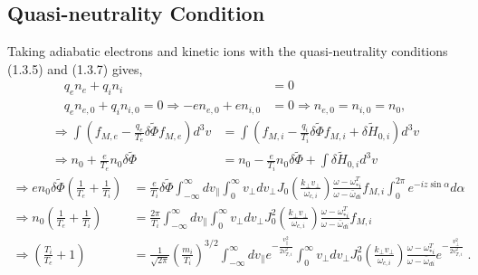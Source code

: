 \documentclass[12pt]{article}
\numberwithin{equation}{subsection}
\begin{document}
\subsection{Quasi-neutrality Condition}
   \quad Taking adiabatic electrons and kinetic ions with the quasi-neutrality conditions (1.3.5) and (1.3.7) gives,
   \begin{equation}
   \begin{aligned}
      q_en_e     + q_in_i     &= 0 \\
      q_en_{e,0} + q_in_{i,0}  = 0 \Rightarrow -en_{e,0} + en_{i,0} &= 0 \Rightarrow n_{e,0} = n_{i,0} = n_0,
   \end{aligned}
   \end{equation}
   \begin{equation}
   \begin{aligned}
      \Rightarrow \int(f_{M,e}-\frac{q_e}{T_e}\delta\widetilde{\Phi}f_{M,e})d^3v
                 &= \int(f_{M,i} - \frac{q_i}{T_i}\delta\widetilde{\Phi}f_{M,i} + \delta\widetilde{H}_{0,i})d^3v \\
      \Rightarrow n_0 + \frac{e}{T_e}n_0\delta\widetilde{\Phi}
                 &= n_0 - \frac{e}{T_i}n_0\delta\widetilde{\Phi} + \int\delta\widetilde{H}_{0,i}d^3v
   \end{aligned}
   \end{equation}
   \begin{equation}
   \begin{aligned}
      \Rightarrow  en_0\delta\widetilde{\Phi}(\frac{1}{T_e} + \frac{1}{T_i})
                &= \frac{e}{T_i}\delta\widetilde{\Phi}\int_{-\infty}^{\infty}dv_\parallel\int_{0}^{\infty}v_\perp dv_\perp
                   J_0(\frac{k_\perp v_\perp}{\omega_{c,i}})\frac{\omega - \omega_{*i}^T}{\omega - \bar{\omega}_{di}}f_{M,i}\int_{0}^{2\pi}e^{-iz\sin\alpha}d\alpha \\
      \Rightarrow n_0(\frac{1}{T_e} + \frac{1}{T_i}) &= \frac{2\pi}{T_i}\int_{-\infty}^{\infty}dv_\parallel\int_{0}^{\infty}v_\perp dv_\perp
                  J_0^2(\frac{k_\perp v_\perp}{\omega_{c,i}})\frac{\omega - \omega_{*i}^T}{\omega - \bar{\omega}_{di}}f_{M,i} \\
      \Rightarrow (\frac{T_i}{T_e} + 1) &= \frac{1}{\sqrt{2\pi}}\left(\frac{m_i}{T_i}\right)^{3/2}\int_{-\infty}^{\infty}dv_\parallel e^{-\frac{v_\parallel^2}{2v^2_{T,i}}}
                  \int_{0}^{\infty}v_\perp dv_\perp J_0^2(\frac{k_\perp v_\perp}{\omega_{c,i}})\frac{\omega - \omega_{*i}^T}{\omega - \bar{\omega}_{di}}e^{-\frac{v_\perp^2}{2v^2_{T,i}}}\;.
   \end{aligned}
   \end{equation}
\end{document}
